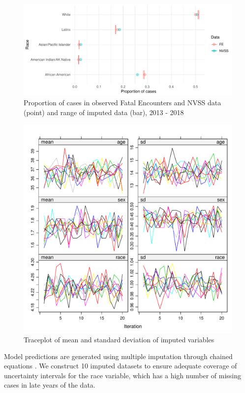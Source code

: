 \documentclass{article}
\begin{document}
\begin{figure}
	\centering
	\includegraphics[width = \linewidth]{vis/race_impute_pct.pdf}
	\caption{Proportion of cases in observed Fatal Encounters and NVSS data (point) and range of imputed data (bar), 2013 - 2018}
	\label{fig:race_impute_pct}
\end{figure}

\begin{figure}
	\centering
	\includegraphics[width = \linewidth]{vis/imp_trace.pdf}
	\caption{Traceplot of mean and standard deviation of imputed variables}
	\label{fig:traceplot}
\end{figure}

Model predictions are generated using multiple imputation through chained equations \cite{buuren2010mice}. We construct 10 imputed datasets to ensure adequate coverage of uncertainty intervals for the race variable, which has a high number of missing cases in late years of the data. 
\end{document}

